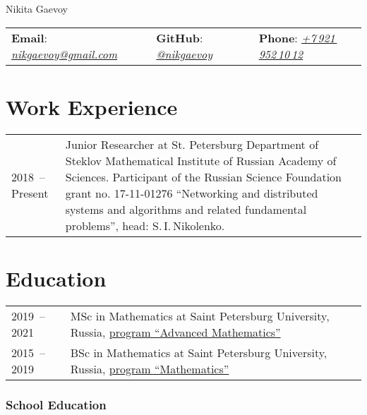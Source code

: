 \documentclass[a4paper, 11pt]{article}
\begin{document}


\begin{center}
    {\Huge Nikita Gaevoy}
\end{center}

\begin{center}
    \begin{tabular}{lll}
        \textbf{Email}: \href{mailto:nikgaevoy@gmail.com}{{\it nikgaevoy@gmail.com}} &
        \hspace{0.13cm} \textbf{GitHub}: \href{https://github.com/nikgaevoy}{{\it @nikgaevoy}} &
        \hspace{0.13cm} \textbf{Phone}: \href{tel:+79219521012}{{\it +7\,921\,952\,10\,12}}
    \end{tabular}
\end{center}

\section*{Work Experience}

\begin{tabularx}{\textwidth}{lX}
    2018~-- Present & Junior Researcher at St. Petersburg Department of Steklov Mathematical Institute of Russian Academy of Sciences. Participant of the Russian Science Foundation grant no. 17-11-01276 ``Networking and distributed systems and algorithms and related fundamental problems'', head: S.\,I.\,Nikolenko.
    \\
\end{tabularx}


\section*{Education}

\begin{tabularx}{\textwidth}{lX}
    2019~-- 2021 & MSc in Mathematics at Saint Petersburg University, Russia, \href{https://math-cs.spbu.ru/en/msc-math-en/}{program ``Advanced Mathematics''} \\
    2015~-- 2019 & BSc in Mathematics at Saint Petersburg University, Russia, \href{https://math-cs.spbu.ru/en/}{program ``Mathematics''} 
\end{tabularx}

\subsubsection*{School Education}
\end{document}
